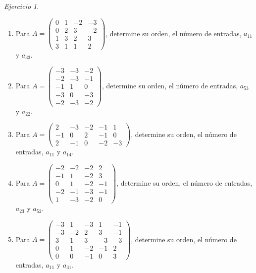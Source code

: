 \documentclass[12pt]{article}
\theoremstyle{remark}
\newtheorem{Ejer}[definicion]{Ejercicio}
\begin{document}
\begin{Ejer}
\begin{enumerate}[start=35]
\item Para $A=\begin{pmatrix}0&1&-2&-3\\0&2&3&-2\\1&3&2&3\\3&1&1&2\end{pmatrix}$, determine su orden, el número de entradas, $a_{11}$ y $a_{33}$.

\item Para $A=\begin{pmatrix}-3&-3&-2\\-2&-3&-1\\-1&1&0\\-3&0&-3\\-2&-3&-2\end{pmatrix}$, determine su orden, el número de entradas, $a_{53}$ y $a_{22}$.

\item Para $A=\begin{pmatrix}2&-3&-2&-1&1\\-1&0&2&-1&0\\2&-1&0&-2&-3\end{pmatrix}$, determine su orden, el número de entradas, $a_{11}$ y $a_{14}$.

\item Para $A=\begin{pmatrix}-2&-2&-2&2\\-1&1&-2&3\\0&1&-2&-1\\-2&-1&-3&-1\\1&-3&-2&0\end{pmatrix}$, determine su orden, el número de entradas, $a_{23}$ y $a_{52}$.

\item Para $A=\begin{pmatrix}-3&1&-3&1&-1\\-3&-2&2&3&-1\\3&1&3&-3&-3\\0&1&-2&-1&2\\0&0&-1&0&3\end{pmatrix}$, determine su orden, el número de entradas, $a_{11}$ y $a_{31}$.

\end{enumerate}
\end{Ejer}
\end{document}
